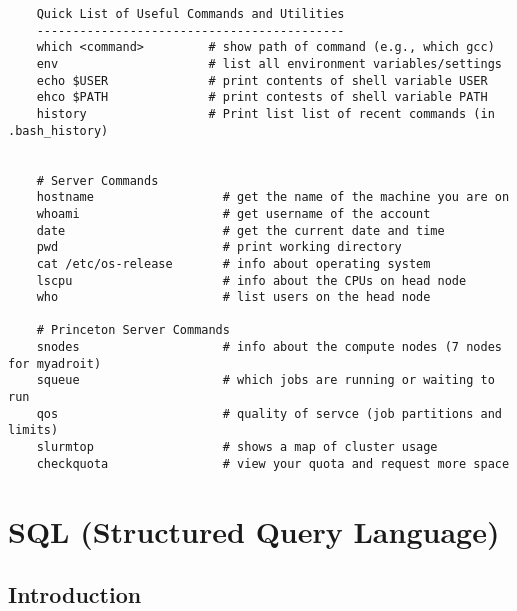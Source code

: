 \documentclass[12pt]{article}
\theoremstyle{plain}
\theoremstyle{definition}
\theoremstyle{remark}
\begin{document}
\begin{lstlisting}
    Quick List of Useful Commands and Utilities
    -------------------------------------------
    which <command>         # show path of command (e.g., which gcc)
    env                     # list all environment variables/settings
    echo $USER              # print contents of shell variable USER
    ehco $PATH              # print contests of shell variable PATH
    history                 # Print list list of recent commands (in .bash_history)


    # Server Commands
    hostname                  # get the name of the machine you are on
    whoami                    # get username of the account
    date                      # get the current date and time
    pwd                       # print working directory
    cat /etc/os-release       # info about operating system
    lscpu                     # info about the CPUs on head node
    who                       # list users on the head node

    # Princeton Server Commands
    snodes                    # info about the compute nodes (7 nodes for myadroit)
    squeue                    # which jobs are running or waiting to run
    qos                       # quality of servce (job partitions and limits)
    slurmtop                  # shows a map of cluster usage
    checkquota                # view your quota and request more space
\end{lstlisting}




\clearpage
\section{SQL (Structured Query Language)}

\subsection{Introduction}
\end{document}
